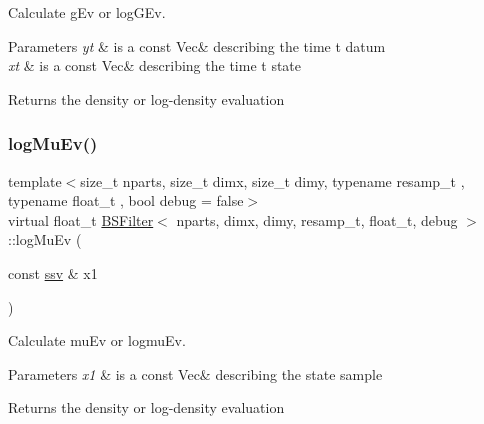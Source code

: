 Calculate g\+Ev or log\+G\+Ev. 


\begin{DoxyParams}{Parameters}
{\em yt} & is a const Vec\& describing the time t datum \\
\hline
{\em xt} & is a const Vec\& describing the time t state \\
\hline
\end{DoxyParams}
\begin{DoxyReturn}{Returns}
the density or log-\/density evaluation 
\end{DoxyReturn}
\mbox{\label{classBSFilter_a460a1a2f97a5d1088a95f6b766e9dc56}} 
\subsubsection{\texorpdfstring{log\+Mu\+Ev()}{logMuEv()}}
{\footnotesize\ttfamily template$<$size\+\_\+t nparts, size\+\_\+t dimx, size\+\_\+t dimy, typename resamp\+\_\+t , typename float\+\_\+t , bool debug = false$>$ \\
virtual float\+\_\+t \hyperlink{classBSFilter}{B\+S\+Filter}$<$ nparts, dimx, dimy, resamp\+\_\+t, float\+\_\+t, debug $>$\+::log\+Mu\+Ev (\begin{DoxyParamCaption}\item[{const \hyperlink{classBSFilter_ad2341b982bcdabc798d7ed0f327d28f7}{ssv} \&}]{x1 }\end{DoxyParamCaption})\hspace{0.3cm}{\ttfamily [pure virtual]}}



Calculate mu\+Ev or logmu\+Ev. 


\begin{DoxyParams}{Parameters}
{\em x1} & is a const Vec\& describing the state sample \\
\hline
\end{DoxyParams}
\begin{DoxyReturn}{Returns}
the density or log-\/density evaluation 
\end{DoxyReturn}
\mbox{\label{classBSFilter_a81321d8ca9960ea4102c6fe3dc7b7636}} 
